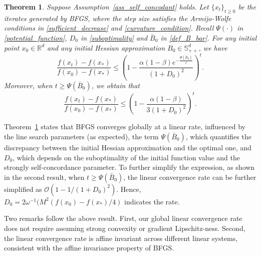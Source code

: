 \documentclass[11pt,letterpaper]{article}
\newcommand\0{{\Vector{0}}}
\newcommand\1{{\Vector{1}}}
\newtheorem{theorem}{Theorem}
\numberwithin{assumption}{section}
\numberwithin{definition}{section}
\numberwithin{theorem}{section}
\numberwithin{remark}{section}
\begin{document}
\begin{theorem}\label{thm:first_linear_rate}
Suppose Assumption~\ref{ass_self_concodant} holds. Let $\{x_t\}_{t\geq 0}$ be the iterates generated by BFGS, where the step size satisfies the Armijo-Wolfe conditions in \eqref{sufficient_decrease} and \eqref{curvature_condition}. Recall $\Psi(\cdot)$ in \eqref{potential_function}, $D_0$ in \eqref{suboptimality} and $\bar{B}_0$ in \eqref{def_B_bar}. For any initial point $x_0 \in \mathbb{R}^{d}$ and any initial Hessian approximation $B_0 \in \mathbb{S}^d_{++}$, we have
\begin{equation}\label{eq:first_linear_rate}
    \frac{f(x_t) - f(x_*)}{f(x_0) - f(x_*)} \leq \left(1 - \frac{\alpha(1 - \beta)e^{-\frac{\Psi(\bar{B}_0)}{t}}}{(1 + D_0)^2}\right)^{t}.
\end{equation}
Moreover, when $t \geq \Psi(\bar{B}_0)$, we obtain that
\begin{equation}\label{eq:first_linear_rate_2}
    \frac{f(x_t) - f(x_*)}{f(x_0) - f(x_*)} \leq \left(1 - \frac{\alpha(1 - \beta)}{3(1 + D_0)^2}\right)^{t}.
\end{equation}
\end{theorem}

Theorem~\ref{thm:first_linear_rate} states that BFGS converges globally at a linear rate, influenced by the line search parameters (as expected), the term $\Psi(\bar{B}_0)$, which quantifies the discrepancy between the initial Hessian approximation and the optimal one, and $D_0$, which depends on the suboptimality of the initial function value and the strongly self-concordance parameter.
To further simplify the expression, as shown in the second result, when $t \geq \Psi(\bar{B}_0)$, the linear convergence rate can be further simplified as  $\mathcal{O}(1 - 1/(1 + D_0)^2)$. Hence, $D_0=2\omega^{-1}({M^2}(f(x_0)-f(x_*)/4)$ indicates the rate. %

Two remarks follow the above result. First, our global linear convergence rate does not require assuming strong convexity or gradient Lipschitz-ness. Second, the linear convergence rate is affine invariant across different linear systems, consistent with the affine invariance property of BFGS. 
\end{document}
